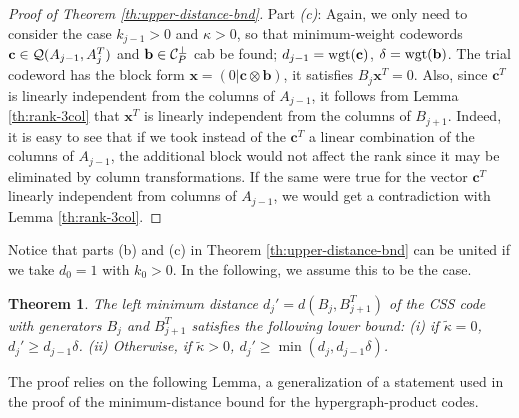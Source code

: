 \documentclass[aps,prb,12pt,tightenlines,%
notitlepage,longbibliography]{revtex4-1}
\newtheorem{theorem}{Theorem}
\begin{document}
\begin{proof}[Proof of Theorem \ref{th:upper-distance-bnd}]
Part \emph{(c)}: Again, we only need to consider the case $k_{j-1}>0$
and $\kappa>0$, so that minimum-weight codewords
$\mathbf{c}\in {\cal Q}(A_{j-1},A_{j}^T)$ and
$\mathbf{b}\in {\cal C}_P^\perp$ cab be found;
$d_{j-1}=\mathop{\rm wgt}(\mathbf{c})$, $\delta=\mathop{\rm wgt}(\mathbf{b})$.  The trial
codeword has the block form
$\mathbf{x}=(0|\mathbf{c}\otimes \mathbf{b})$, it satisfies
$B_{j}\mathbf{x}^T=0$.  Also, since $\mathbf{c}^T$ is linearly
independent from the columns of $A_{j-1}$, it follows from Lemma
\ref{th:rank-3col} that $\mathbf{x}^T$ is linearly independent from
the columns of $B_{j+1}$.  Indeed, it is easy to see that if we took
instead of the $\mathbf{c}^T$ a linear combination of the columns of
$A_{j-1}$, the additional block would not affect the rank since it may
be eliminated by column transformations.  If the same were true for
the vector $\mathbf{c}^T$ linearly independent from columns
of $A_{j-1}$, we would get a contradiction with Lemma
\ref{th:rank-3col}.
\end{proof}

Notice that parts (b) and (c) in Theorem \ref{th:upper-distance-bnd}
can be united if we take $d_0=1$ with $k_0>0$.  In the following, we
assume this to be the case.
\begin{theorem}
  \label{th:lower-distance-bnd}
The left minimum distance $d_j'=d(B_j,B_{j+1}^T)$ of the CSS code with
generators $B_j$ and $B_{j+1}^T$ satisfies the following lower bound:
(i) if $\tilde{\kappa}=0$, $d_j'\ge d_{j-1}\delta$. 
(ii) Otherwise, if $\tilde{\kappa}>0$,  $d_j'\ge \min(d_j,d_{j-1}\delta)$.  
\end{theorem}
The proof relies on the following Lemma, a generalization of a
statement used in the proof of the minimum-distance bound for the
hypergraph-product codes\cite{Tillich-Zemor-2009}.
\end{document}
